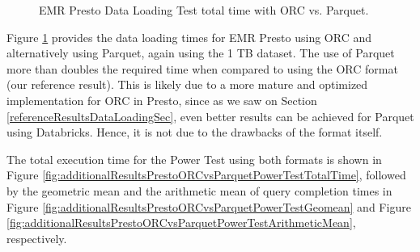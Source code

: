 \begin{figure}
   \begin{center}
   \end{center}
   \caption{EMR Presto Data Loading Test total time with ORC vs. Parquet.}
   \label{fig:additionalResultsPrestoORCvsParquetDataLoading}
\end{figure}

Figure \ref{fig:additionalResultsPrestoORCvsParquetDataLoading} provides the data loading times for EMR Presto using ORC and alternatively using Parquet, again using the 1 TB dataset. The use of Parquet more than doubles the required time when compared to using the ORC format (our reference result). This is likely due to a more mature and optimized implementation for ORC in Presto, since as we saw on Section \ref{referenceResultsDataLoadingSec}, even better results can be achieved for Parquet using Databricks. Hence, it is not due to the drawbacks of the format itself.

The total execution time for the Power Test using both formats is shown in Figure \ref{fig:additionalResultsPrestoORCvsParquetPowerTestTotalTime}, followed by the geometric mean and the arithmetic mean of query completion times in Figure \ref{fig:additionalResultsPrestoORCvsParquetPowerTestGeomean} and Figure \ref{fig:additionalResultsPrestoORCvsParquetPowerTestArithmeticMean}, respectively.

